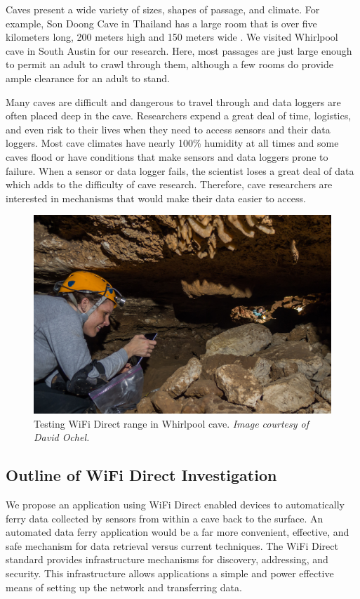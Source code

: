 \documentclass[10pt,twocolumn]{article}
\begin{document}
Caves present a wide variety of sizes, shapes of passage, and climate. 
For example, Son Doong Cave in Thailand has a large room that is over five kilometers long, 200 meters high and 150 meters wide \cite{sondoong}.
We visited Whirlpool cave in South Austin for our research.
Here, most passages are just large enough to permit an adult to crawl through them, although a few rooms do provide ample clearance for an adult to stand. 

Many caves are difficult and dangerous to travel through and data loggers are often placed deep in the cave.
Researchers expend a great deal of time, logistics, and even risk to their lives when they need to access sensors and their data loggers.
Most cave climates have nearly 100\% humidity at all times and some caves flood or have conditions that make sensors and data loggers prone to failure.
When a sensor or data logger fails, the scientist loses a great deal of data which adds to the difficulty of cave research.
Therefore, cave researchers are interested in mechanisms that would make their data easier to access.

\begin{figure}[t]
\includegraphics[width=\textwidth]{cavewifi2}
\caption{Testing WiFi Direct range in Whirlpool cave. \textit{Image courtesy of David Ochel.}}
\end{figure}

\subsection{Outline of WiFi Direct Investigation}
\label{sec:Outline}
We propose an application using WiFi Direct enabled devices to automatically ferry data collected by sensors from within a cave back to the surface.
An automated data ferry application would be a far more convenient, effective, and safe mechanism for data retrieval versus current techniques.  
The WiFi Direct standard provides infrastructure mechanisms for discovery, addressing, and security. 
This infrastructure allows applications a simple and power effective means of setting up the network and transferring data. 
\end{document}

